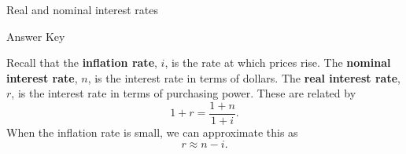 \documentclass[twoside]{article}
\begin{document}
\pagestyle{empty}
\thispagestyle{empty}

\vspace*{-1cm}
\enlargethispage{4\baselineskip}
\begin{center}
\Large Real and nominal interest rates \begin{KEY} Answer Key \end{KEY}
\end{center}
\normalsize
\bigskip
\bigskip

\noindent Recall that the \textbf{inflation rate}, $i$, is the rate at which prices rise. The \textbf{nominal interest rate}, $n$, is the interest rate in terms of dollars. The \textbf{real interest rate}, $r$, is the interest rate in terms of purchasing power. These are related by
\[
1+r=\frac{1+n}{1+i}.
\]
When the inflation rate is small, we can approximate this as
\[
r \approx n-i.
\]

\bigskip
\bigskip
\end{document}

